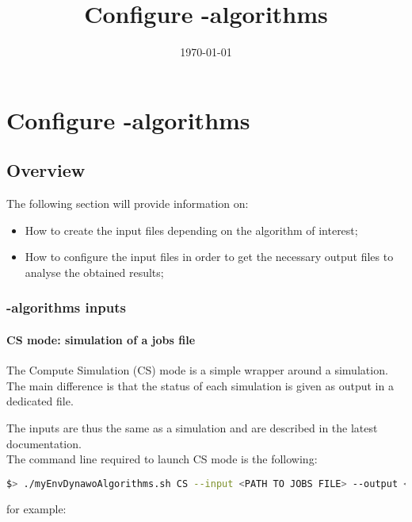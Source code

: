 \documentclass[a4paper, 12pt]{report}
\begin{document}
\title{Configure \Dynawo-algorithms}
\date\today

\maketitle
\tableofcontents

\chapter[Configure Dynawo-algorithms]{Configure \Dynawo-algorithms}

\section{Overview}

The following section will provide information on:
\begin{itemize}
\item How to create the input files depending on the algorithm of interest;
\item How to configure the input files in order to get the  necessary output files to analyse the obtained results;
\end{itemize}


\subsection[Dynawo-algorithms inputs]{\Dynawo-algorithms inputs}
\subsubsection{CS mode: simulation of a jobs file}

The Compute Simulation (CS) mode is a simple wrapper around a \Dynawo simulation. 
The main difference is that the status of each simulation is given as output in a dedicated file.

The inputs are thus the same as a \Dynawo simulation and are described in the latest \Dynawo documentation.\\

The command line required to launch CS mode is the following:

\begin{lstlisting}[language=bash, breaklines=true, breakatwhitespace=false]
$> ./myEnvDynawoAlgorithms.sh CS --input <PATH TO JOBS FILE> --output <PATH TO RESULT FILE>
\end{lstlisting}

for example:
\end{document}
